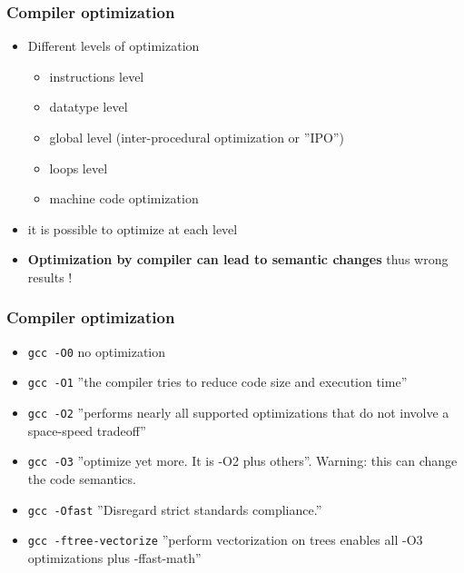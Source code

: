 \begin{frame}
\frametitle{Compiler optimization}

\begin{itemize}
	\item Different levels of optimization
	\begin{itemize}
		\item instructions level
		\item datatype level
		\item global level (inter-procedural optimization or ''IPO'')
		\item loops level
		\item machine code optimization
	\end{itemize}
	\item it is possible to optimize at each level
	\item {\bf Optimization by compiler can lead to semantic changes} thus wrong results ! 
\end{itemize}

\end{frame}


\begin{frame}
\frametitle{Compiler optimization}

\begin{itemize}
	\item {\tt gcc -O0} no optimization
	\item {\tt gcc -O1} ''the compiler tries to reduce code size and execution time''
	\item {\tt gcc -O2} ''performs nearly all supported optimizations that do not involve a space-speed tradeoff''
	\item {\tt gcc -O3} ''optimize yet more. It is -O2 plus others''. Warning: this can change the code semantics.
	\item {\tt gcc -Ofast} ''Disregard strict standards compliance.''
	\item {\tt gcc -ftree-vectorize} ''perform vectorization on trees enables all -O3 optimizations plus -ffast-math''
\end{itemize}

\end{frame}





